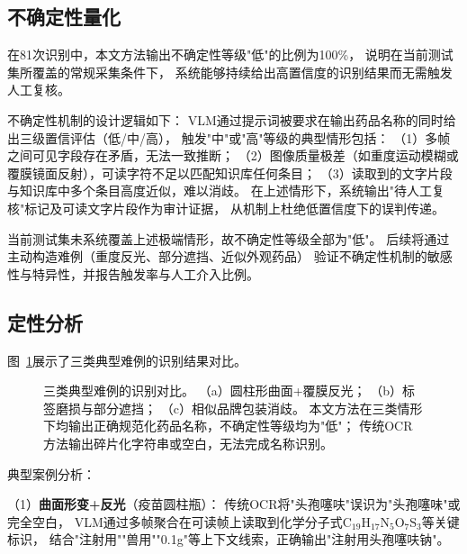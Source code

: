 \documentclass[12pt, a4paper]{article}
\begin{document}
\subsection{不确定性量化}
\label{sec:exp:uncertainty}

在81次识别中，本文方法输出不确定性等级"低"的比例为100\%，
说明在当前测试集所覆盖的常规采集条件下，
系统能够持续给出高置信度的识别结果而无需触发人工复核。

不确定性机制的设计逻辑如下：
VLM通过提示词被要求在输出药品名称的同时给出三级置信评估（低/中/高），
触发"中"或"高"等级的典型情形包括：
（1）多帧之间可见字段存在矛盾，无法一致推断；
（2）图像质量极差（如重度运动模糊或覆膜镜面反射），可读字符不足以匹配知识库任何条目；
（3）读取到的文字片段与知识库中多个条目高度近似，难以消歧。
在上述情形下，系统输出"待人工复核"标记及可读文字片段作为审计证据，
从机制上杜绝低置信度下的误判传递。

当前测试集未系统覆盖上述极端情形，故不确定性等级全部为"低"。
后续将通过主动构造难例（重度反光、部分遮挡、近似外观药品）
验证不确定性机制的敏感性与特异性，并报告触发率与人工介入比例。

\subsection{定性分析}
\label{sec:exp:qualitative}

图~\ref{fig:qualitative}展示了三类典型难例的识别结果对比。

\begin{figure}[htbp]
\centering
{}
\caption{三类典型难例的识别对比。
         （a）圆柱形曲面+覆膜反光；
         （b）标签磨损与部分遮挡；
         （c）相似品牌包装消歧。
         本文方法在三类情形下均输出正确规范化药品名称，不确定性等级均为"低"；
         传统OCR方法输出碎片化字符串或空白，无法完成名称识别。}
\label{fig:qualitative}
\end{figure}

典型案例分析：

\noindent（1）\textbf{曲面形变+反光}（疫苗圆柱瓶）：
传统OCR将"头孢噻呋"误识为"头孢噻味"或完全空白，
VLM通过多帧聚合在可读帧上读取到化学分子式$\mathrm{C_{19}H_{17}N_5O_7S_3}$等关键标识，
结合"注射用""兽用""0.1g"等上下文线索，正确输出"注射用头孢噻呋钠"。
\end{document}
